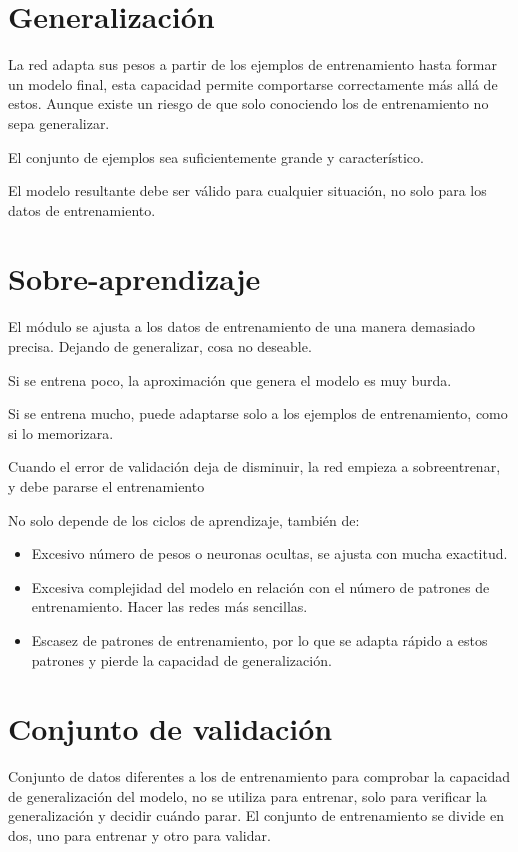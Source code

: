 \documentclass[12pt, twoside, openright]{report} %
\begin{document}
\section{Generalización}
La red adapta sus pesos a partir de los ejemplos de entrenamiento hasta formar un modelo final, esta capacidad permite comportarse correctamente más allá de estos. Aunque existe un riesgo de que solo conociendo los de entrenamiento no sepa generalizar.

El conjunto de ejemplos sea suficientemente grande y característico.

El modelo resultante debe ser válido para cualquier situación, no solo para los datos de entrenamiento.

\section{Sobre-aprendizaje}
El módulo se ajusta a los datos de entrenamiento de una manera demasiado precisa. Dejando de generalizar, cosa no deseable.

Si se entrena poco, la aproximación que genera el modelo es muy burda.

Si se entrena mucho, puede adaptarse solo a los ejemplos de entrenamiento, como si lo memorizara.

Cuando el error de validación deja de disminuir, la red empieza a sobreentrenar, y debe pararse el entrenamiento

No solo depende de los ciclos de aprendizaje, también de:
\begin{itemize}
	\item Excesivo número de pesos o neuronas ocultas, se ajusta con mucha exactitud.
	\item Excesiva complejidad del modelo en relación con el número de patrones de entrenamiento. Hacer las redes más sencillas.
	\item Escasez de patrones de entrenamiento, por lo que se adapta rápido a estos patrones y pierde la capacidad de generalización.
\end{itemize}

\section{Conjunto de validación}
Conjunto de datos diferentes a los de entrenamiento para comprobar la capacidad de generalización del modelo, no se utiliza para entrenar, solo para verificar la generalización y decidir cuándo parar. El conjunto de entrenamiento se divide en dos, uno para entrenar y otro para validar.
\end{document}
